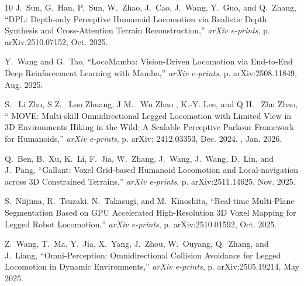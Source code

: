 \documentclass[letterpaper, 10 pt, conference]{ieeeconf/ieeeconf}
\providecommand{\DIFadd}[1]{{\protect\color{blue} \sf #1}} %
\providecommand{\DIFdel}[1]{{\protect\color{red} \scriptsize #1}} %
\providecommand{\DIFaddbegin}{} %
\providecommand{\DIFaddend}{} %
\providecommand{\DIFdelbegin}{} %
\providecommand{\DIFdelend}{} %
\begin{document}
\begin{thebibliography}{10}
J.~{Sun}, G.~{Han}, P.~{Sun}, W.~{Zhao}, J.~{Cao}, J.~{Wang}, Y.~{Guo}, and
  Q.~{Zhang}, ``{DPL: Depth-only Perceptive Humanoid Locomotion via Realistic
  Depth Synthesis and Cross-Attention Terrain Reconstruction},'' \emph{arXiv
  e-prints}, p. arXiv:2510.07152, Oct. 2025.

Y.~{Wang} and G.~{Tao}, ``{LocoMamba: Vision-Driven Locomotion via End-to-End
  Deep Reinforcement Learning with Mamba},'' \emph{arXiv e-prints}, p.
  arXiv:2508.11849, Aug. 2025.

\DIFdelbegin {}
\DIFdelend \DIFaddbegin {}
\DIFaddend S.~{\DIFdelbegin \DIFdel{Li}\DIFdelend \DIFaddbegin \DIFadd{Zhu}\DIFaddend }, \DIFdelbegin \DIFdel{S}\DIFdelend \DIFaddbegin \DIFadd{Z}\DIFaddend .~{\DIFdelbegin \DIFdel{Luo}\DIFdelend \DIFaddbegin \DIFadd{Zhuang}\DIFaddend }, \DIFdelbegin \DIFdel{J}\DIFdelend \DIFaddbegin \DIFadd{M}\DIFaddend .~{\DIFdelbegin \DIFdel{Wu}\DIFdelend \DIFaddbegin \DIFadd{Zhao}}\DIFadd{, K.-Y. }{\DIFadd{Lee}\DIFaddend }, and \DIFdelbegin \DIFdel{Q}\DIFdelend \DIFaddbegin \DIFadd{H}\DIFaddend .~{\DIFdelbegin \DIFdel{Zhu}\DIFdelend \DIFaddbegin \DIFadd{Zhao}\DIFaddend }, ``{\DIFdelbegin \DIFdel{MOVE: Multi-skill Omnidirectional
  Legged Locomotion with Limited View in 3D Environments}\DIFdelend \DIFaddbegin \DIFadd{Hiking in the
  Wild: A Scalable Perceptive Parkour Framework for Humanoids}\DIFaddend },'' \emph{arXiv
  e-prints}, p. arXiv:\DIFdelbegin \DIFdel{2412.03353, Dec. 2024.
}\DIFdelend \DIFaddbegin \DIFadd{2601.07718, Jan. 2026.
}\DIFaddend 

Q.~{Ben}, B.~{Xu}, K.~{Li}, F.~{Jia}, W.~{Zhang}, J.~{Wang}, J.~{Wang},
  D.~{Lin}, and J.~{Pang}, ``{Gallant: Voxel Grid-based Humanoid Locomotion and
  Local-navigation across 3D Constrained Terrains},'' \emph{arXiv e-prints}, p.
  arXiv:2511.14625, Nov. 2025.

S.~{Niijima}, R.~{Tsuzaki}, N.~{Takasugi}, and M.~{Kinoshita}, ``{Real-time
  Multi-Plane Segmentation Based on GPU Accelerated High-Resolution 3D Voxel
  Mapping for Legged Robot Locomotion},'' \emph{arXiv e-prints}, p.
  arXiv:2510.01592, Oct. 2025.

Z.~{Wang}, T.~{Ma}, Y.~{Jia}, X.~{Yang}, J.~{Zhou}, W.~{Ouyang}, Q.~{Zhang},
  and J.~{Liang}, ``{Omni-Perception: Omnidirectional Collision Avoidance for
  Legged Locomotion in Dynamic Environments},'' \emph{arXiv e-prints}, p.
  arXiv:2505.19214, May 2025.


\end{thebibliography}
\end{document}
